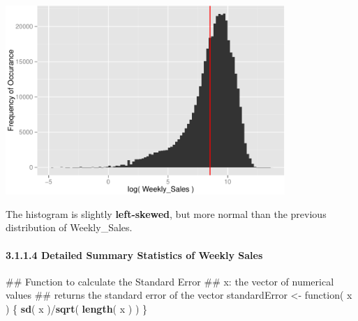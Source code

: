 \documentclass[]{article}
\newenvironment{Shaded}{\begin{snugshade}}{\end{snugshade}}
\newcommand{\KeywordTok}[1]{\textcolor[rgb]{0.13,0.29,0.53}{\textbf{{#1}}}}
\newcommand{\DecValTok}[1]{\textcolor[rgb]{0.00,0.00,0.81}{{#1}}}
\newcommand{\StringTok}[1]{\textcolor[rgb]{0.31,0.60,0.02}{{#1}}}
\newcommand{\NormalTok}[1]{{#1}}
\begin{document}
\includegraphics[width=400px]{PredictingWeeklySalesAtWalmart_files/figure-latex/logWeeklySalesHistogram-1}

The histogram is slightly \textbf{left-skewed}, but more normal than the
previous distribution of Weekly\_Sales.

\paragraph{3.1.1.4 Detailed Summary Statistics of Weekly
Sales}\label{detailed-summary-statistics-of-weekly-sales}

\begin{Shaded}
\begin{Highlighting}[]
\NormalTok{## Function to calculate the Standard Error}
\NormalTok{## x: the vector of numerical values}
\NormalTok{## returns the standard error of the vector}
\NormalTok{standardError <-}\StringTok{ }\NormalTok{function( x ) \{}
  \KeywordTok{sd}\NormalTok{( x )/}\KeywordTok{sqrt}\NormalTok{( }\KeywordTok{length}\NormalTok{( x ) )}
\NormalTok{\}}
\end{Highlighting}
\end{Shaded}

\begin{Shaded}
\end{Shaded}
\end{document}
